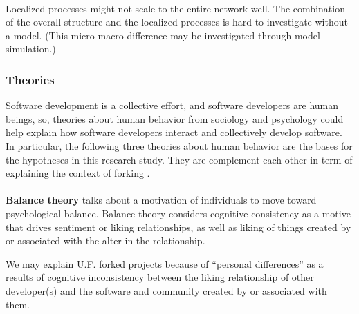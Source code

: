 \documentclass{report}
\begin{document}
\paragraph{} Localized processes might not scale to the entire network well. The combination of the overall structure and the localized processes is hard to investigate without a model. (This micro-macro difference may be investigated through model simulation.)\cite{Robins}

\subsubsection{Theories}
Software development is a collective effort, and software developers are human beings, so, theories about human behavior from sociology and psychology could help explain how software developers interact and collectively develop software. In particular, the following three theories about human behavior are the bases for the hypotheses in this research study. They are complement each other in term of explaining the context of forking .

\paragraph{} \textbf{Balance theory} \cite{Heider} talks about a motivation of individuals to move toward psychological balance. Balance theory considers cognitive consistency as a motive that drives sentiment or liking relationships, as well as liking of things created by or associated with the alter in the relationship.

We may explain U.F. forked projects because of ``personal differences'' as a results of cognitive inconsistency between the liking relationship of other developer(s) and the software and community created by or associated with them. 
%
%
\end{document}
